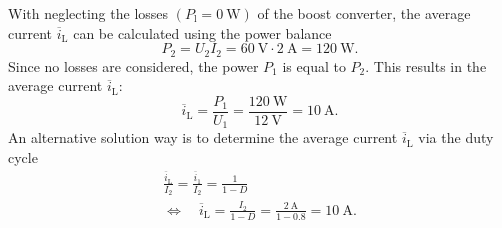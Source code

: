 \begin{solutionblock}
	With neglecting the losses $(P_{\mathrm{l}} = \SI{0}{\watt})$ of the boost converter, the average current $\overline i_{\mathrm{L}}$ can be calculated using the power balance
	\begin{equation}
		P_{\mathrm{2}} = U_{\mathrm{2}} I_{\mathrm{2}} = {\SI{60}{\volt}} \cdot {\SI{2}{\ampere}} = {\SI{120}{\watt}}.
	\end{equation}
	Since no losses are considered, the power  $P_{\mathrm{1}}$ is equal to  $P_{\mathrm{2}}$.
	This results in the average current $\overline i_{\mathrm{L}}$:
	\begin{equation}
		\overline i_{\mathrm{L}} = \frac{P_{\mathrm{1}}}{U_{\mathrm{1}}}= \frac{\SI{120}{\watt}}{\SI{12}{\volt}} = \SI{10}{\ampere}.
	\end{equation}
	An alternative solution way is to determine the average current $\overline i_{\mathrm{L}}$ via the duty cycle
	\begin{equation}
		\begin{gathered}
			\frac{\overline i_{\mathrm{L}}}{I_{\mathrm{2}}}=\frac{\overline i_{1}}{I_{\mathrm{2}}}=\frac{1}{1-D} \\
			\Leftrightarrow \quad \overline i_{\mathrm{L}}=\frac{I_{\mathrm{2}}}{1-D}=\frac{\SI{2}{\ampere}}{1-0.8}= \SI{10}{\ampere}.
		\end{gathered}
		\label{eq:task_2_1_2_sol_average_inductor_current}
	\end{equation}
\end{solutionblock}

